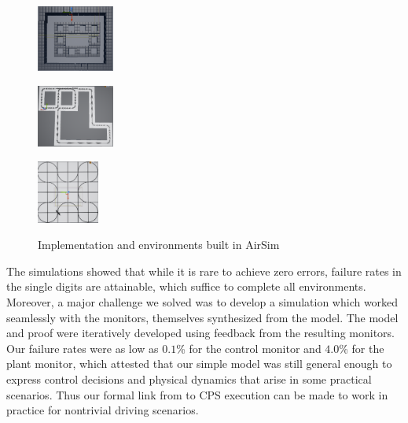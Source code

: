 \documentclass[12pt]{cmuthesis}
\theoremstyle{definition}
\theoremstyle{remark}
\begin{document}
\begin{figure}[tb]
\begin{minipage}[b]{0.15\textwidth}\centering
\includegraphics[width=1in]{graphics/screen1.png}
\label{fig:rect}\end{minipage}
\begin{minipage}[b]{0.15\textwidth}\centering
\includegraphics[width=1in]{graphics/screen2.png}
\label{fig:turns}\end{minipage}
\begin{minipage}[b]{0.15\textwidth}\centering
\includegraphics[width=0.8in]{graphics/screen3.png}
\label{fig:clover}\end{minipage}
\caption{Implementation and environments built in AirSim}
\label{fig:patrol-plan}
\end{figure}
The simulations showed that while it is rare to achieve zero errors, failure rates in the single digits are attainable, which suffice to complete all environments.
Moreover, a major challenge we solved was to develop a simulation which worked seamlessly with the monitors, themselves synthesized from the model.
The model and proof were iteratively developed using feedback from the resulting monitors.
Our failure rates were as low as $0.1$\% for the control monitor and $4.0$\% for the plant monitor, which attested that our simple model was still general enough to express control decisions and physical dynamics that arise in some practical scenarios.
Thus our formal link from \dL to CPS execution can be made to work in practice for nontrivial driving scenarios.
\end{document}
